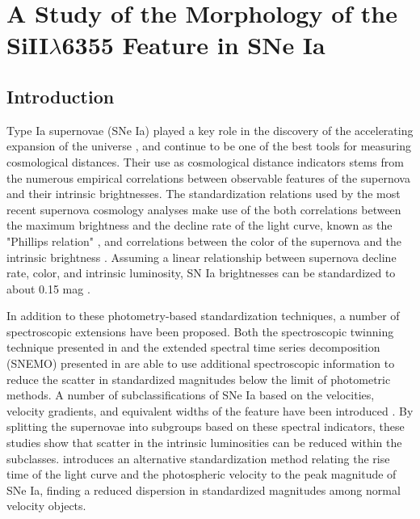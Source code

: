 \chapter{A Study of the Morphology of the SiII\texorpdfstring{$\lambda$}{}6355 Feature in SNe Ia}

\section{Introduction}
\label{intro}
Type Ia supernovae (SNe Ia) played a key role in the discovery of the accelerating expansion of the universe \citep{perlmutter_measurements_1999, riess_observational_1998}, and continue to be one of the best tools for measuring cosmological distances. Their use as cosmological distance indicators stems from the numerous empirical correlations between observable features of the supernova and their intrinsic brightnesses. The standardization relations used by the most recent supernova cosmology analyses make use of the both correlations between the maximum brightness and the decline rate of the light curve, known as the "Phillips relation" \citep{phillips_absolute_1993}, and correlations between the color of the supernova and the intrinsic brightness \citep{riess_mlcs_1996, tripp_twoparameter_1998, guy_salt:_2005, guy_salt2:_2007}. Assuming a linear relationship between supernova decline rate, color, and intrinsic luminosity, SN Ia brightnesses can be standardized to about 0.15 mag \citep{betoule_improved_2014}.

In addition to these photometry-based standardization techniques, a number of spectroscopic extensions have been proposed. Both the spectroscopic twinning technique presented in \parencite{fakhouri_improving_2015} and the extended spectral time series decomposition (SNEMO) presented in \parencite{saunders_improved_2018} are able to use additional spectroscopic information to reduce the scatter in standardized magnitudes below the limit of photometric methods. A number of subclassifications of SNe Ia based on the velocities, velocity gradients, and equivalent widths of the \siliconii feature have been introduced \citep{branch_comparative_2006, benetti_diversity_2005, wang_improved_2009, wang_evidence_2013}. By splitting the supernovae into subgroups based on these spectral indicators, these studies show that scatter in the intrinsic luminosities can be reduced within the subclasses. \parencite{zheng_empirical_2018} introduces an alternative standardization method relating the rise time of the light curve and the photospheric velocity to the peak magnitude of SNe Ia, finding a reduced dispersion in standardized magnitudes among normal velocity objects.

